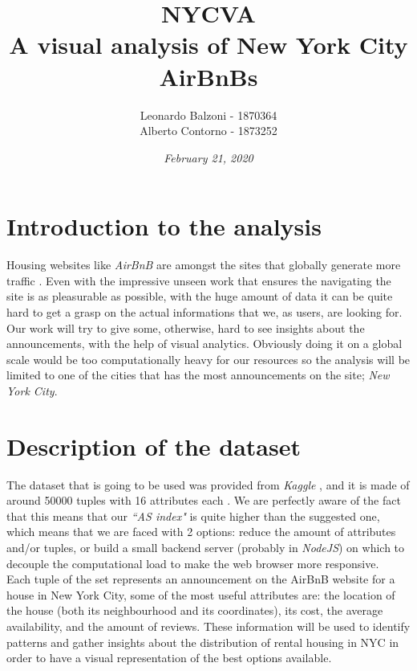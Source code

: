 \documentclass[11pt]{article}
\title{\bigskip \Large {\bf NYCVA \\ A visual analysis of New York City AirBnBs}}
\date{\em February 21, 2020}
\author{Leonardo Balzoni - 1870364 \\ Alberto Contorno - 1873252}
\begin{document}
\maketitle
\newpage


\section{Introduction to the analysis}
Housing websites like {\em AirBnB} \cite{ABNB} are amongst the sites that globally generate more traffic \cite{ABNBTRAFFIC}. Even with the impressive unseen work that ensures the navigating the site is as pleasurable as possible, with the huge amount of data it can be quite hard to get a grasp on the actual informations that we, as users, are looking for. Our work will try to give some, otherwise, hard to see insights about the announcements, with the help of visual analytics. Obviously doing it on a global scale would be too computationally heavy for our resources so the analysis will be limited to one of the cities that has the most announcements on the site; {\em New York City}.

\section{Description of the dataset}
The dataset that is going to be used was provided from {\em Kaggle} \cite{KAGGLE}, and it is made of around 50000 tuples with 16 attributes each \cite{NYCDATASET}. We are perfectly aware of the fact that this means that our {\em ``AS index"} is quite higher than the suggested one, which means that we are faced with 2 options: reduce the amount of attributes and/or tuples, or build a small backend server (probably in {\em NodeJS}) on which to decouple the computational load to make the web browser more responsive.\\
Each tuple of the set represents an announcement on the AirBnB website for a house in New York City, some of the most useful attributes are: the location of the house (both its neighbourhood and its coordinates), its cost, the average availability, and the amount of reviews. These information will be used to identify patterns and gather insights about the distribution of rental housing in NYC in order to have a visual representation of the best options available.
\end{document}

